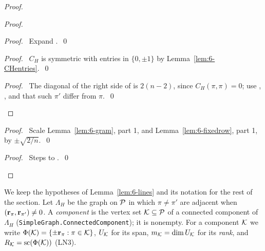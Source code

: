 \begin{proof}
\begin{proof}
  \begin{proof}\pf\ Expand .~\qed\end{proof}
  \begin{proof}\pf\ $C_H$ is symmetric with entries in $\{0,\pm1\}$ by
   Lemma~\ref{lem:6-CHentries}.~\qed\end{proof}
  \qedstep
  \begin{proof}\pf\ The diagonal of the right side of  is $2(n-2)$, since
   $C_H(\pi,\pi)=0$; use , , and that such $\pi'$ differ from
   $\pi$.~\qed\end{proof}
 \end{proof}
 \begin{proof}\pf\ Scale Lemma~\ref{lem:6-gram}, part 1, and Lemma~\ref{lem:6-fixedrow},
  part 1, by $\pm\sqrt{2/n}$.~\qed\end{proof}
 \qedstep
 \begin{proof}\pf\ Steps  to .~\qed\end{proof}
\end{proof}

We keep the hypotheses of Lemma~\ref{lem:6-lines} and its notation for the rest of the section.
Let $\Lambda_H$ be the graph on ${\mathcal P}$ in which $\pi\neq\pi'$ are adjacent when
$({\mathbf r}_\pi,{\mathbf r}_{\pi'})\neq0$. A \emph{component} is the vertex set ${\mathcal K}\subseteq{\mathcal P}$ of a connected
component of $\Lambda_H$ (\texttt{SimpleGraph.ConnectedComponent}); it is nonempty. For a
component ${\mathcal K}$ we write $\Phi({\mathcal K})=\{\pm{\mathbf r}_\pi:\pi\in{\mathcal K}\}$, $U_{\mathcal K}$ for its span,
$m_{\mathcal K}=\dim U_{\mathcal K}$ for its \emph{rank}, and $R_{\mathcal K}=\mathop{\mathrm{sc}}\nolimits(\Phi({\mathcal K}))$ (LN3).

